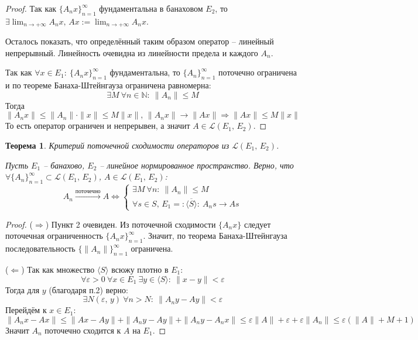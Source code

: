 \documentclass[a4paper,12pt]{article}
\renewcommand{\leq}{\ensuremath{\leqslant}}
\theoremstyle{plain}
\newtheorem{theorem}{Теорема}[section]
\theoremstyle{definition}
\theoremstyle{remark}
\begin{document}
\begin{proof}
  Так как $\{A_nx\}_{n=1}^\infty$ фундаментальна в банаховом $E_2$, то $\exists \lim_{n \to +\infty} A_nx,\, Ax := \lim_{n \to +\infty}A_nx$.

  Осталось показать, что определённый таким образом оператор -- линейный непрерывный. Линейность очевидна из линейности предела и каждого $A_n$.

  Так как $\forall x \in E_1 :\: \{A_nx\}_{n=1}^\infty$ фундаментальна, то $\{A_n\}_{n=1}^\infty$ поточечно ограничена и по теореме Банаха-Штейнгауза ограничена равномерна:
  \[
    \exists M \: \forall n \in \mathbb{N} :\: \|A_n\| \leq M  
  \]
  Тогда
  \[
    \|A_nx\| \leq \|A_n\|\cdot\|x\| \leq M\|x\|,\, \|A_nx\| \to \|Ax\| \Rightarrow \|Ax\| \leq M\|x\|
  \]
  То есть оператор ограничен и непрерывен, а значит $A \in \mathcal{L}(E_1,\, E_2)$.
\end{proof}

\begin{theorem}
  Критерий поточечной сходимости операторов из $\mathcal{L}(E_1,\,E_2)$.

  Пусть $E_1$ -- банахово, $E_2$ -- линейное нормированное пространство. Верно, что $\forall \{A_n\}_{n=1}^\infty \subset \mathcal{L}(E_1,\,E_2)$, $A \in \mathcal{L}(E_1,\,E_2)$:
  \[
    A_n \overset{\text{поточечно}}{\to} A \Leftrightarrow \begin{cases}
      \exists M \: \forall n :\: \|A_n\| \leq M\\
      \forall s \in S,\, E_1 =: \overline{\langle S\rangle}  :\: A_ns \to As
    \end{cases}
  \]
\end{theorem}

\begin{proof}
  ($\Rightarrow$) Пункт 2 очевиден. Из поточечной сходимости $\{A_nx\}$ следует поточечная ограниченность $\{A_nx\}_{n=1}^\infty$. Значит, по теорема Банаха-Штейнгауза последовательность $\{\|A_n\|\}_{n=1}^\infty$ ограничена.

  ($\Leftarrow$) Так как множество $\langle S\rangle$ всюжу плотно в $E_1$:
  \[
    \forall \varepsilon > 0 \: \forall x \in E_1 \: \exists y \in \langle S\rangle :\: \|x - y\| < \varepsilon
  \]
  Тогда для $y$ (благодаря п.2) верно:
  \[
    \exists N(\varepsilon,\, y) \: \forall n > N :\: \|A_ny - Ay\| < \varepsilon
  \]
  Перейдём к $x \in E_1$:
  \[
    \|A_nx - Ax\| \leq \|Ax - Ay\| + \|A_ny - Ay\| + \|A_ny - A_nx\| \leq \varepsilon\|A\| + \varepsilon + \varepsilon\|A_n\| \leq \varepsilon(\|A\| + M + 1)
  \]
  Значит $A_n$ поточечно сходится к $A$ на $E_1$.
\end{proof}
\end{document}
